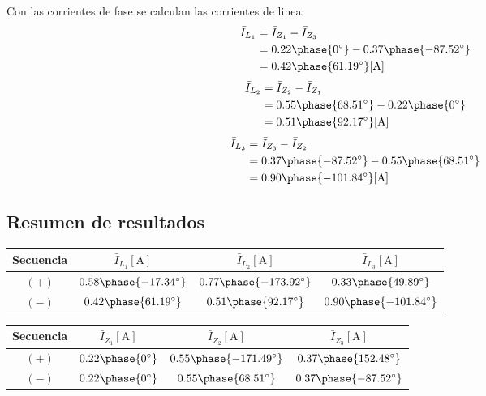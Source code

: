\documentclass[letter,11pt]{article}
\begin{document}
Con las corrientes de fase se calculan las corrientes de linea:
\begin{equation*}
    \begin{split}
        \bar{I}_{L_1} &= \bar{I}_{Z_1}-\bar{I}_{Z_3}\\
                      &= 0.22\phase{0^{\circ}}-0.37\phase{-87.52^{\circ}}\\
                      &= 0.42\phase{61.19^{\circ}}[\text{A}]\\
    \end{split}
\end{equation*}
\begin{equation*}
    \begin{split}
        \bar{I}_{L_2} &= \bar{I}_{Z_2}-\bar{I}_{Z_1}\\
                      &= 0.55\phase{68.51^{\circ}}-0.22\phase{0^{\circ}}\\
                      &= 0.51\phase{92.17^{\circ}}[\text{A}]\\
    \end{split}
\end{equation*}
\begin{equation*}
    \begin{split}
        \bar{I}_{L_3} &= \bar{I}_{Z_3}-\bar{I}_{Z_2}\\
                      &= 0.37\phase{-87.52^{\circ}}-0.55\phase{68.51^{\circ}}\\
                      &= 0.90\phase{-101.84^{\circ}}[\text{A}]\\
    \end{split}
\end{equation*}

\subsection{Resumen de resultados}
\begin{center}
    \begin{tabular}{|c||c|c|c|}
    \hline
    \textbf{Secuencia} &
    $\bar{I}_{L_1}[\text{A}]$ &
    $\bar{I}_{L_2}[\text{A}]$ &
    $\bar{I}_{L_3}[\text{A}]$
    \tabularnewline \hline \hline
    $(+)$ &
    $0.58\phase{-17.34^{\circ}}$ &
    $0.77\phase{-173.92^{\circ}}$ &
    $0.33\phase{49.89^{\circ}}$
    \tabularnewline \hline
    $(-)$ &
    $0.42\phase{61.19^{\circ}}$ &
    $0.51\phase{92.17^{\circ}}$ &
    $0.90\phase{-101.84^{\circ}}$
    \tabularnewline \hline
    \end{tabular}
\end{center}
\begin{center}
    \begin{tabular}{|c||c|c|c|}
    \hline
    \textbf{Secuencia} &
    $\bar{I}_{Z_1}[\text{A}]$ &
    $\bar{I}_{Z_2}[\text{A}]$ &
    $\bar{I}_{Z_3}[\text{A}]$
    \tabularnewline \hline \hline
    $(+)$ &
    $0.22\phase{0^{\circ}}$ &
    $0.55\phase{-171.49^{\circ}}$ &
    $0.37\phase{152.48^{\circ}}$
    \tabularnewline \hline
    $(-)$ &
    $0.22\phase{0^{\circ}}$ &
    $0.55\phase{68.51^{\circ}}$ &
    $0.37\phase{-87.52^{\circ}}$
    \tabularnewline \hline
    \end{tabular}
\end{center}
\end{document}
